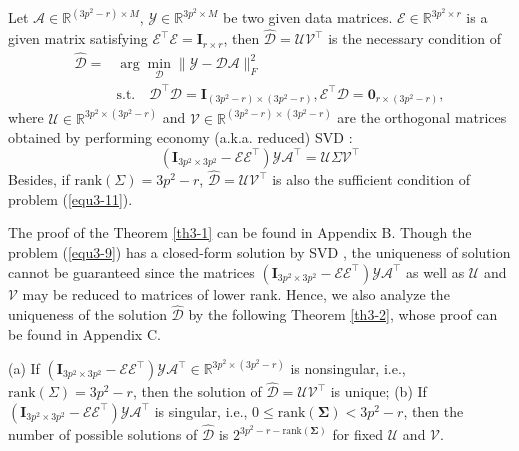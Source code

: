 \begin{theorem}
\label{th3-1}
Let $\mathcal{A}\in \mathbb{R}^{(3p^2-r)\times M}$, $\mathcal{Y}\in \mathbb{R}^{3p^2\times M}$ be two given data matrices. $\mathcal{E}\in\mathbb{R}^{3p^2\times r}$ is a given matrix satisfying $\mathcal{E}^{\top}\mathcal{E}=\bm{I}_{r\times r}$, then $\hat{\mathcal{D}} = \mathcal{U}\mathcal{V}^{\top}$ is the necessary condition of
\begin{equation}\label{equ3-11}
\begin{split}
\hat{\mathcal{D}}
=
&
\arg\min_{\mathcal{D}}\|\mathcal{Y}-\mathcal{D}\mathcal{A}\|_{F}^{2}
\quad
\\
&
\text{s.t.}
\quad
\mathcal{D}^{\top}\mathcal{D} = \bm{I}_{(3p^2-r)\times (3p^2-r)}, \mathcal{E}^{\top}\mathcal{D} = \bm{0}_{r\times (3p^2-r)}
,
\end{split}
\end{equation}
where $\mathcal{U}\in \mathbb{R}^{3p^2\times (3p^2-r)}$ and $\mathcal{V}\in \mathbb{R}^{(3p^2-r)\times (3p^2-r)}$ are the orthogonal matrices obtained by performing economy (a.k.a. reduced) SVD  \cite{eckart1936approximation}:
\begin{equation}\label{equ3-12}
(\bm{I}_{3p^2\times 3p^2}-\mathcal{E}\mathcal{E}^{\top})\mathcal{Y}\mathcal{A}^{\top} = \mathcal{U}\Sigma\mathcal{V}^{\top}
\end{equation}
Besides, if $\text{rank}(\Sigma)=3p^2-r$, $\hat{\mathcal{D}} = \mathcal{U}\mathcal{V}^{\top}$ is also the sufficient condition of problem (\ref{equ3-11}). 
\end{theorem}


The proof of the Theorem \ref{th3-1} can be found in Appendix B. Though the problem (\ref{equ3-9}) has a closed-form solution by SVD \cite{eckart1936approximation}, the uniqueness of solution cannot be guaranteed since the matrices $(\bm{I}_{3p^2\times 3p^2}-\mathcal{E}\mathcal{E}^{\top})\mathcal{Y}\mathcal{A}^{\top}$ as well as $\mathcal{U}$ and $\mathcal{V}$ may be reduced to matrices of lower rank. Hence, we also analyze the uniqueness of the solution $\hat{\mathcal{D}}$ by the following Theorem \ref{th3-2}, whose proof can be found in Appendix C.

\begin{theorem}
\label{th3-2}
(a) If $(\bm{I}_{3p^2\times 3p^2}-\mathcal{E}\mathcal{E}^{\top})\mathcal{Y}\mathcal{A}^{\top}\in\mathbb{R}^{3p^2\times (3p^2-r)}$ is nonsingular, i.e., $\text{rank}(\Sigma)=3p^2-r$, then the solution of $\hat{\mathcal{D}}=\mathcal{U}\mathcal{V}^{\top}$ is unique; (b) If $(\bm{I}_{3p^2\times 3p^2}-\mathcal{E}\mathcal{E}^{\top})\mathcal{Y}\mathcal{A}^{\top}$ is singular, i.e., $0\le\text{rank}(\bm{\Sigma})< 3p^2-r$, then the number of possible solutions of $\hat{\mathcal{D}}$ is $2^{3p^2-r-\text{rank}(\bm{\Sigma})}$ for fixed $\mathcal{U}$ and $\mathcal{V}$.
\end{theorem}

